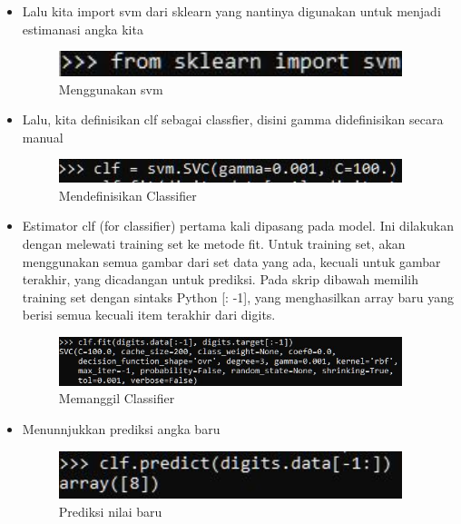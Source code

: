 \begin{itemize}
\item Lalu kita import svm dari sklearn yang nantinya digunakan untuk menjadi estimanasi angka kita
\begin{figure}[H]
	\begin{center}
   	 \includegraphics[width=10cm]{figures/1174083/figures1/4.jpg}
   	 \caption{Menggunakan svm}	
	\end{center}
\end{figure}

\item Lalu, kita definisikan clf sebagai classfier, disini gamma didefinisikan secara manual
\begin{figure}[H]
	\begin{center}
   	 \includegraphics[width=10cm]{figures/1174083/figures1/8.jpg}
   	 \caption{Mendefinisikan Classifier}	
	\end{center}
\end{figure}

\item Estimator clf (for classifier) pertama kali dipasang pada model. Ini dilakukan dengan melewati training set ke metode fit. Untuk training set, akan menggunakan semua gambar dari set data yang ada, kecuali untuk gambar terakhir, yang dicadangan untuk prediksi. Pada skrip dibawah memilih training set dengan sintaks Python [: -1], yang menghasilkan array baru yang berisi semua kecuali item terakhir dari digits.
\begin{figure}[H]
	\begin{center}
   	 \includegraphics[width=10cm]{figures/1174083/figures1/9.jpg}
   	 \caption{Memanggil Classifier}	
	\end{center}
\end{figure}

\item Menunnjukkan prediksi angka baru
\begin{figure}[H]
	\begin{center}
   	 \includegraphics[width=10cm]{figures/1174083/figures1/10.jpg}
   	 \caption{Prediksi nilai baru}	
	\end{center}
\end{figure}
\end{itemize}


